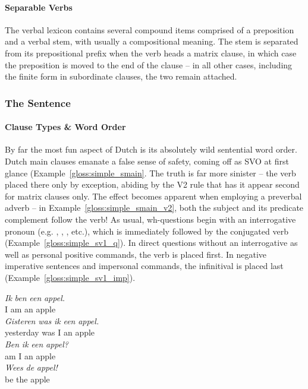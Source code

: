 \paragraph{Separable Verbs} 
The verbal lexicon contains several compound items comprised of a preposition and a verbal stem, with usually a compositional meaning.
The stem is separated from its prepositional prefix when the verb heads a matrix clause, in which case the preposition is moved to the end of the clause -- in all other cases, including the finite form in subordinate clauses, the two remain attached.

\subsubsection{The Sentence}
\paragraph{Clause Types \& Word Order}
By far the most fun aspect of Dutch is its absolutely wild sentential word order.
Dutch main clauses emanate a false sense of safety, coming off as SVO at first glance (Example~\ref{gloss:simple_smain}.
The truth is far more sinister -- the verb placed there only by exception, abiding by the V2 rule that has it appear second for matrix clauses only.
The effect becomes apparent when employing a preverbal adverb -- in Example~\ref{gloss:simple_smain_v2}, both the subject and its predicate complement follow the verb!
As usual, wh-questions begin with an interrogative pronoun (e.g. , , , etc.), which is immediately followed by the conjugated verb (Example~\ref{gloss:simple_sv1_q}).
In direct questions without an interrogative as well as personal positive commands, the verb is placed first.
In negative imperative sentences and impersonal commands, the infinitival is placed last (Example~\ref{gloss:simple_sv1_imp}).

\begin{exe}
\ex\label{gloss:simple_smain}
\gll \textit{Ik} \textit{ben} \textit{een} \textit{appel}\textit{.}\\
I am an apple\\
\ex\label{gloss:simple_smain_v2}
\gll \textit{Gisteren} \textit{was} \textit{ik} \textit{een} \textit{appel}\textit{.}\\
yesterday was I an apple\\
\ex\label{gloss:simple_sv1_q}
\gll \textit{Ben} \textit{ik} \textit{een} \textit{appel}\textit{?}\\
am I an apple\\
\ex\label{gloss:simple_sv1_imp}
\gll \textit{Wees} \textit{de} \textit{appel}\textit{!}\\
be the apple\\
\end{exe}
%

